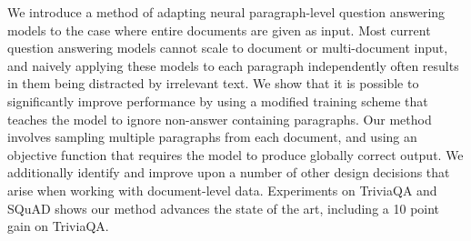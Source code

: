 We introduce a method of adapting neural paragraph-level question answering models to the case where entire documents are given as input. Most current question answering models cannot scale to document or multi-document input, and naively applying these models to each paragraph independently often results in them being distracted by irrelevant text. We show that it is possible to significantly improve performance by using a modified training scheme that teaches the model to ignore non-answer containing paragraphs. Our method involves sampling multiple paragraphs from each document, and using an objective function that requires the model to produce globally correct output. We additionally identify and improve upon a number of other design decisions that arise when working with document-level data. Experiments on TriviaQA and SQuAD shows our method advances the state of the art, including a 10 point gain on TriviaQA.

